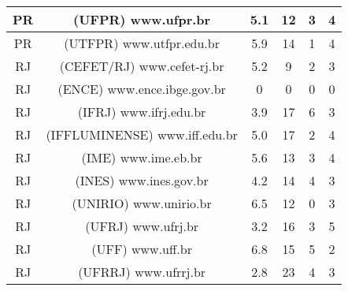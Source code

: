 \begin{center}
\begin{longtable}{|c|l|l|l|l|l|}
\hline
\multicolumn{1}{|c|}{PR} & \multicolumn{1}{c|}{(UFPR) www.ufpr.br} & \multicolumn{1}{c|}{5.1} & \multicolumn{1}{c|}{12} & \multicolumn{1}{c|}{3} & \multicolumn{1}{c|}{4} \\ 
\hline
\multicolumn{1}{|c|}{PR} & \multicolumn{1}{c|}{(UTFPR) www.utfpr.edu.br} & \multicolumn{1}{c|}{5.9} & \multicolumn{1}{c|}{14} & \multicolumn{1}{c|}{1} & \multicolumn{1}{c|}{4} \\ 
\hline
\multicolumn{1}{|c|}{RJ} & \multicolumn{1}{c|}{(CEFET/RJ) www.cefet-rj.br} & \multicolumn{1}{c|}{5.2} & \multicolumn{1}{c|}{9} & \multicolumn{1}{c|}{2} & \multicolumn{1}{c|}{3} \\ 
\hline
\multicolumn{1}{|c|}{RJ} & \multicolumn{1}{c|}{(ENCE) www.ence.ibge.gov.br} & \multicolumn{1}{c|}{0} & \multicolumn{1}{c|}{0} & \multicolumn{1}{c|}{0} & \multicolumn{1}{c|}{0} \\ 
\hline
\multicolumn{1}{|c|}{RJ} & \multicolumn{1}{c|}{(IFRJ) www.ifrj.edu.br} & \multicolumn{1}{c|}{3.9} & \multicolumn{1}{c|}{17} & \multicolumn{1}{c|}{6} & \multicolumn{1}{c|}{3} \\ 
\hline
\multicolumn{1}{|c|}{RJ} & \multicolumn{1}{c|}{(IFFLUMINENSE) www.iff.edu.br} & \multicolumn{1}{c|}{5.0} & \multicolumn{1}{c|}{17} & \multicolumn{1}{c|}{2} & \multicolumn{1}{c|}{4} \\ 
\hline
\multicolumn{1}{|c|}{RJ} & \multicolumn{1}{c|}{(IME) www.ime.eb.br} & \multicolumn{1}{c|}{5.6} & \multicolumn{1}{c|}{13 } & \multicolumn{1}{c|}{3} & \multicolumn{1}{c|}{4} \\ 
\hline
\multicolumn{1}{|c|}{RJ} & \multicolumn{1}{c|}{(INES) www.ines.gov.br} & \multicolumn{1}{c|}{4.2} & \multicolumn{1}{c|}{14} & \multicolumn{1}{c|}{4} & \multicolumn{1}{c|}{3} \\ 
\hline
\multicolumn{1}{|c|}{RJ} & \multicolumn{1}{c|}{(UNIRIO) www.unirio.br} & \multicolumn{1}{c|}{6.5} & \multicolumn{1}{c|}{12} & \multicolumn{1}{c|}{0} & \multicolumn{1}{c|}{3} \\ 
\hline
\multicolumn{1}{|c|}{RJ} & \multicolumn{1}{c|}{(UFRJ) www.ufrj.br} & \multicolumn{1}{c|}{3.2} & \multicolumn{1}{c|}{16} & \multicolumn{1}{c|}{3} & \multicolumn{1}{c|}{5} \\ 
\hline
\multicolumn{1}{|c|}{RJ} & \multicolumn{1}{c|}{(UFF) www.uff.br} & \multicolumn{1}{c|}{6.8} & \multicolumn{1}{c|}{15} & \multicolumn{1}{c|}{5} & \multicolumn{1}{c|}{2} \\ 
\hline
\multicolumn{1}{|c|}{RJ} & \multicolumn{1}{c|}{(UFRRJ) www.ufrrj.br} & \multicolumn{1}{c|}{2.8} & \multicolumn{1}{c|}{23} & \multicolumn{1}{c|}{4} & \multicolumn{1}{c|}{3} \\ 

\end{longtable}
\end{center}
